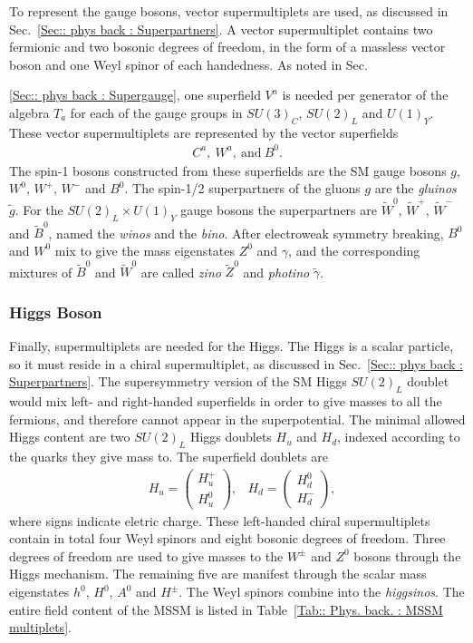 \documentclass[twoside,english]{uiofysmaster}
\begin{document}
To represent the gauge bosons, vector supermultiplets are used, as discussed in Sec.~\ref{Sec:: phys back : Superpartners}. A vector supermultiplet contains two fermionic and two bosonic degrees of freedom, in the form of a massless vector boson and one Weyl spinor of each handedness. As noted in Sec.~{\ref{Sec:: phys back : Supergauge}, one superfield $V^a$ is needed per generator of the algebra $T_a$ for each of the gauge groups in $SU(3)_C$, $SU(2)_L$ and $U(1)_Y$. These vector supermultiplets are represented by the vector superfields 
\begin{align}
C^a, ~W^a, ~\mathrm{and}~B^0.
\end{align}
The spin-1 bosons constructed from these superfields are the SM gauge bosons $g$, $W^0$, $W^+$, $W^-$ and $B^0$. The spin-1/2 superpartners of the gluons $g$ are the \textit{gluinos} $\widetilde{g}$. For the $SU(2)_L \times U(1)_Y$ gauge bosons the superpartners are $\widetilde{W}^0$, $\widetilde{W}^+$, $\widetilde{W}^-$ and $\widetilde{B}^0$, named the \textit{winos} and the \textit{bino}. After electroweak symmetry breaking, $B^0$ and $W^0$ mix to give the mass eigenstates $Z^0$ and $\gamma$, and the corresponding mixtures of $\widetilde{B}^0$ and $\widetilde{W}^0$ are called \textit{zino} $\widetilde{Z}^0$ and \textit{photino} $\widetilde{\gamma}$. 

\subsubsection{Higgs Boson}

Finally, supermultiplets are needed for the Higgs. The Higgs is a scalar particle, so it must reside in a chiral supermultiplet, as discussed in Sec.~\ref{Sec:: phys back : Superpartners}. The supersymmetry version of the SM Higgs $SU(2)_L$ doublet would mix left- and right-handed superfields in order to give masses to all the fermions, and therefore cannot appear in the superpotential. The minimal allowed Higgs content are two $SU(2)_L$ Higgs doublets $H_u$ and $H_d$, indexed according to the quarks they give mass to. The superfield doublets are
\begin{align}
&H_u = \begin{pmatrix}
H_u^+\\
H_u^0
\end{pmatrix},
&H_d = \begin{pmatrix}
H_d^0\\
H_d^-
\end{pmatrix},
\end{align}
where signs indicate eletric charge. These left-handed chiral supermultiplets contain in total four Weyl spinors and eight bosonic degrees of freedom. Three degrees of freedom are used to give masses to the $W^{\pm}$ and $Z^0$ bosons through the Higgs mechanism. The remaining five are manifest through the scalar mass eigenstates $h^0$, $H^0$, $A^0$ and $H^{\pm}$. The Weyl spinors combine into the \textit{higgsinos}. The entire field content of the MSSM is listed in Table~\ref{Tab:: Phys. back. : MSSM multiplets}.

}
\end{document}
